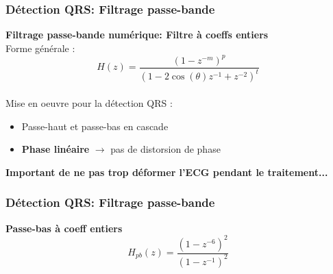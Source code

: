 \documentclass{beamer}
\begin{document}
\begin{frame}
\frametitle{Détection QRS: Filtrage passe-bande}
 \textbf{Filtrage passe-bande numérique: Filtre à coeffs entiers}\\
 \vspace{0.2cm}
 Forme générale : 
 \[ H(z) = \frac{(1 -z^{-m})^p}{(1 - 2 \cos(\theta)z^{-1} + z^{-2})^t} \] \\
 \vspace{0.2cm}
 Mise en oeuvre pour la détection QRS :
 \begin{itemize}
 \item  Passe-haut et passe-bas en cascade
 \item \textbf{Phase linéaire} $\rightarrow$ pas de distorsion de phase
 \end{itemize}
 \vspace{0.2cm}
 \textbf{Important de ne pas trop déformer l'ECG pendant le traitement...}
\end{frame}

\begin{frame}
\frametitle{Détection QRS: Filtrage passe-bande}
 \textbf{Passe-bas à coeff entiers}\\
  \vspace{0.2cm}
   \[ H_{pb}(z) = \frac{(1 -z^{-6})^2}{(1 - z^{-1} )^2} \]
   \vspace{0.1cm}
   \begin{columns}
	\column{60mm}
	\begin{center}
	\end{center}
	\column{60mm}  
		\begin{center}
	\end{center} 
   
   \end{columns}
  \end{frame}
  
\end{document}
